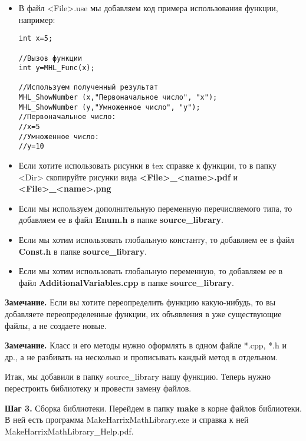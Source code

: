 \documentclass[a4paper,12pt]{article}
\begin{document}
\begin{itemize}
\begin{lstlisting}[label=examplefiletex, caption=Содержимое MHL\_Func.tex]
 x --- входной параметр.

\textbf{Возвращаемое значение:}
Число умноженное на 2.
\end{lstlisting}

\item В файл <File>.use мы добавляем код примера использования функции, например:
\begin{lstlisting}[label=examplefileuse, caption=Содержимое MHL\_Func.use]
int x=5;

//Вызов функции
int y=MHL_Func(x);

//Используем полученный результат
MHL_ShowNumber (x,"Первоначальное число", "x");
MHL_ShowNumber (y,"Умноженное число", "y");
//Первоначальное число:
//x=5
//Умноженное число:
//y=10
\end{lstlisting}

\item Если хотите использовать рисунки в tex справке к функции, то в папку <Dir> скопируйте рисунки вида  \textbf{<File>\_<name>.pdf} и \textbf{<File>\_<name>.png}

\item Если мы используем дополнительную переменную перечисляемого типа, то добавляем ее в файл \textbf{Enum.h} в папке \textbf{source\_library}.

\item Если мы хотим использовать глобальную константу, то добавляем ее в файл \textbf{Const.h} в папке \textbf{source\_library}.

\item Если мы хотим использовать глобальную переменную, то добавляем ее в файл \textbf{AdditionalVariables.cpp} в папке \textbf{source\_library}.

\end{itemize}

\textbf{Замечание.} Если вы хотите переопределить функцию какую-нибудь, то вы добавляете переопределенные функции, их объявления в уже существующие файлы, а не создаете новые.

\textbf{Замечание.} Класс и его методы нужно оформлять в одном файле *.cpp, *.h и др., а не разбивать на несколько и прописывать каждый метод в отдельном.

Итак, мы добавили в папку source\_library нашу функцию. Теперь нужно перестроить библиотеку и провести замену файлов.

\textbf{Шаг 3.}\label{step3} Сборка библиотеки. Перейдем в папку \textbf{make} в корне файлов библиотеки. В ней есть программа MakeHarrixMathLibrary.exe и справка к ней MakeHarrixMathLibrary\_Help.pdf. 
\end{document}
